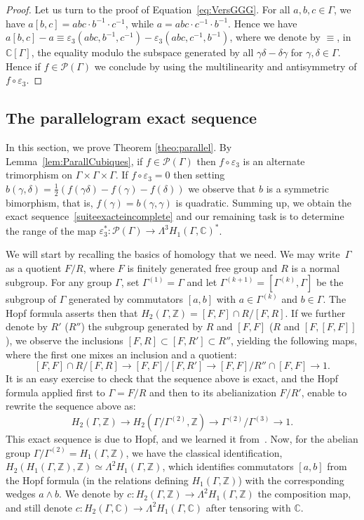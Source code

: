 \documentclass[JEP,XML,SOM,Unicode,NoEqCountersInSection]{cedram}
\let\mathcal\mathscr
\theoremstyle{definition}
\newcommand{\ZZ}{\mathbb{Z}}
\newcommand{\CC}{\mathbb{C}}
\begin{document}
\begin{proof}
Let us turn to the proof of Equation~\eqref{eq:VersGGG}.
For all $a,b,c\in\Gamma$, we have
$a[b,c]=abc\cdot b^{-1}\cdot c^{-1}$, while $a=abc\cdot c^{-1}\cdot b^{-1}$.
Hence we have
$a[b,c]-a\equiv\varepsilon_3(abc,b^{-1},c^{-1})-
\varepsilon_3(abc,c^{-1},b^{-1})$,
where we denote by $\equiv$, in $\CC[\Gamma]$, the equality modulo the
subspace generated by all $\gamma\delta-\delta\gamma$ for
$\gamma,\delta\in\Gamma$.
Hence if $f\in \mathcal{P}(\Gamma)$ we conclude by using the multilinearity
and antisymmetry of $f\circ \varepsilon_3$.
\end{proof}

\subsection{The parallelogram exact sequence}\label{ssec:suiteexacte}
In this section, we prove Theorem \ref{theo:parallel}.
By Lemma~\ref{lem:ParallCubiques},
if $f\in \mathcal{P}(\Gamma)$ then
$f\circ\varepsilon_3$ is an alternate trimorphism on
$\Gamma\times \Gamma\times \Gamma$. If $f\circ \varepsilon_3=0$ then setting
$b(\gamma,\delta)=\frac{1}{2}(f(\gamma\delta)-f(\gamma)-f(\delta))$
we observe that $b$ is a symmetric bimorphism, that is,
$f(\gamma)=b(\gamma,\gamma)$ is quadratic.
Summing up, we obtain the exact sequence~\eqref{suiteexacteincomplete} and
our remaining task is to determine the range of the map
$\varepsilon_3^*\colon
\mathcal{P}(\Gamma)\to\Lambda^3H_1(\Gamma,\CC)^*$.

We will start by recalling the basics of homology that we need.
We may write~$\Gamma$ as a quotient $F/R$, where $F$ is finitely generated
free group and $R$ is a normal subgroup.
For any group $\Gamma$, set $\Gamma^{(1)}=\Gamma$
and let $\Gamma^{(k+1)}=[\Gamma^{(k)},\Gamma]$ be the subgroup of
$\Gamma$ generated by commutators
$[a,b]$ with $a\in \Gamma^{(k)}$ and $b\in \Gamma$.
The Hopf formula asserts then that
$H_2(\Gamma,\ZZ)=[F,F]\cap R/[F,R]$. If we further denote by
$R'$ (\resp $R''$) the subgroup generated by $R$ and $[F,F]$
(\resp $R$ and $[F,[F,F]]$),
we observe the inclusions \hbox{$[F,R]\subset[F,R']\subset R''$}, yielding the
following maps, where the first one mixes an inclusion and a quotient:
\[ [F,F]\cap R/[F,R]\to [F,F]/[F,R'] \to [F,F]/R''\cap[F,F]\to 1. \]
It is an easy exercise to check that the sequence above is exact, and
the Hopf formula applied first to $\Gamma=F/R$ and then to its
abelianization $F/R'$, enable to rewrite the sequence above as:
\begin{equation}\label{eq:Stallings}
H_2(\Gamma,\ZZ)\to H_2(\Gamma/\Gamma^{(2)},\ZZ)\to \Gamma^{(2)}/\Gamma^{(3)}
\to 1.
\end{equation}
This exact sequence is due to Hopf, and we learned it from~\cite{Stallings}.
Now, for the abelian group $\Gamma/\Gamma^{(2)}=H_1(\Gamma,\ZZ)$, we
have the classical identification,
$H_2(H_1(\Gamma,\ZZ),\ZZ)\simeq\Lambda^2 H_1(\Gamma,\ZZ)$, which
identifies commutators $[a,b]$ from the Hopf formula (in the relations
defining $H_1(\Gamma,\ZZ)$) with the corresponding wedges $a\wedge b$.
We denote by $c\colon H_2(\Gamma,\ZZ)\to\Lambda^2H_1(\Gamma,\ZZ)$ the
composition map, and still denote
$c\colon H_2(\Gamma,\CC)\to\Lambda^2H_1(\Gamma,\CC)$ after tensoring with $\CC$.
\end{document}
